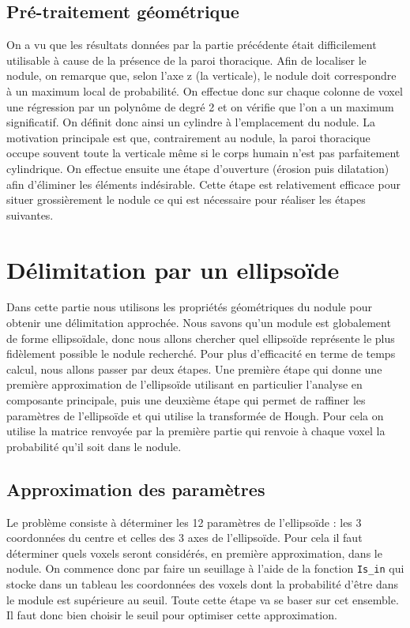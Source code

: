 \documentclass{article}
\begin{document}
\subsection{Pré-traitement géométrique}

On a vu que les résultats données par la partie précédente était difficilement utilisable à cause de la présence de la paroi thoracique. Afin de localiser le nodule, on remarque que, selon l'axe z (la verticale), le nodule doit correspondre à un maximum local de probabilité. On effectue donc sur chaque colonne de voxel une régression par un polynôme de degré 2 et on vérifie que l'on a un maximum significatif. 
On définit donc ainsi un cylindre à l'emplacement du nodule. La motivation principale est que, contrairement au nodule, la paroi thoracique occupe souvent toute la verticale même si le corps humain n'est pas parfaitement cylindrique.
On effectue ensuite une étape d'ouverture (érosion puis dilatation) afin d'éliminer les éléments indésirable.
Cette étape est relativement efficace pour situer grossièrement le nodule ce qui est nécessaire pour réaliser les étapes suivantes.



\section{Délimitation par un ellipsoïde}


Dans cette partie nous utilisons les propriétés géométriques du nodule pour obtenir une délimitation approchée. Nous savons qu'un module est globalement de forme ellipsoïdale, donc nous allons chercher quel ellipsoïde représente le plus fidèlement possible le nodule recherché. Pour plus d'efficacité en terme de temps calcul, nous allons passer par deux étapes. Une première étape qui donne une première approximation de l'ellipsoïde utilisant en particulier l'analyse en composante principale, puis une deuxième étape qui permet de raffiner les paramètres de l'ellipsoïde et qui utilise la transformée de Hough. Pour cela on utilise la matrice renvoyée par la première partie qui renvoie à chaque voxel la probabilité qu'il soit dans le nodule.

\subsection{Approximation des paramètres}

Le problème consiste à déterminer les 12 paramètres de l'ellipsoïde : les 3 coordonnées du centre et celles des 3 axes de l'ellipsoïde. Pour cela il faut déterminer quels voxels seront considérés, en première approximation, dans le nodule. On commence donc par faire un seuillage à  l'aide de la fonction  \texttt{Is\_in} qui stocke dans un tableau les coordonnées des voxels dont la probabilité d'être dans le module est supérieure au seuil. Toute cette étape va se baser sur cet ensemble. Il faut donc bien choisir le seuil pour optimiser cette approximation.
\end{document}
